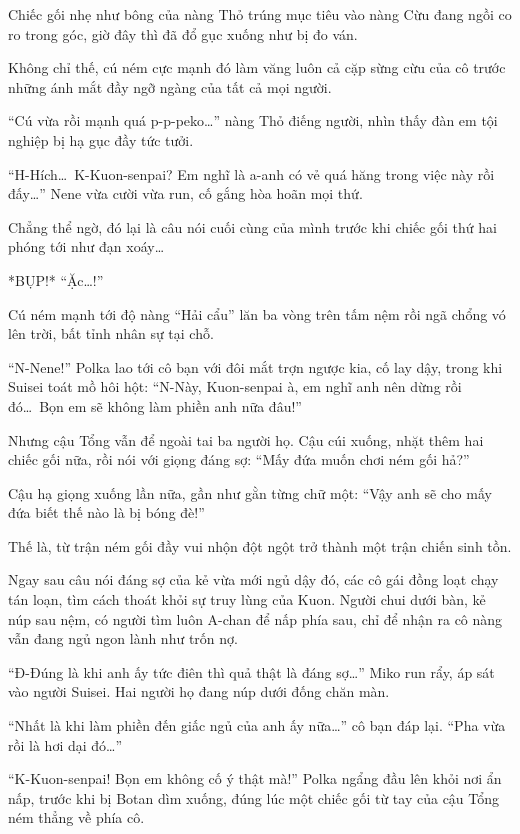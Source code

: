 \documentclass[../main.tex]{subfiles}
\begin{document}
Chiếc gối nhẹ như bông của nàng Thỏ trúng mục tiêu vào nàng Cừu đang ngồi co ro trong góc, giờ đây thì đã đổ gục xuống như bị đo ván.

Không chỉ thế, cú ném cực mạnh đó làm văng luôn cả cặp sừng cừu của cô trước những ánh mắt đầy ngỡ ngàng của tất cả mọi người.

``Cú vừa rồi mạnh quá p-p-peko\dots'' nàng Thỏ điếng người, nhìn thấy đàn em tội nghiệp bị hạ gục đầy tức tưởi.

``H-Hích\dots\ K-Kuon-senpai? Em nghĩ là a-anh có vẻ quá hăng trong việc này rồi đấy\dots'' Nene vừa cười vừa run, cố gắng hòa hoãn mọi thứ.

Chẳng thể ngờ, đó lại là câu nói cuối cùng của mình trước khi chiếc gối thứ hai phóng tới như đạn xoáy\dots

*BỤP!* ``Ặc\dots!''

Cú ném mạnh tới độ nàng ``Hải cẩu'' lăn ba vòng trên tấm nệm rồi ngã chổng vó lên trời, bất tỉnh nhân sự tại chỗ.

``N-Nene!'' Polka lao tới cô bạn với đôi mắt trợn ngược kia, cố lay dậy, trong khi Suisei toát mồ hôi hột: ``N-Này, Kuon-senpai à, em nghĩ anh nên dừng rồi đó\dots\ Bọn em sẽ không làm phiền anh nữa đâu!''

Nhưng cậu Tổng vẫn để ngoài tai ba người họ. Cậu cúi xuống, nhặt thêm hai chiếc gối nữa, rồi nói với giọng đáng sợ: ``Mấy đứa muốn chơi ném gối hả?''

Cậu hạ giọng xuống lần nữa, gần như gằn từng chữ một: ``Vậy anh sẽ cho mấy đứa biết thế nào là bị bóng đè!''

Thế là, từ trận ném gối đầy vui nhộn đột ngột trở thành một trận chiến sinh tồn.

Ngay sau câu nói đáng sợ của kẻ vừa mới ngủ dậy đó, các cô gái đồng loạt chạy tán loạn, tìm cách thoát khỏi sự truy lùng của Kuon. Người chui dưới bàn, kẻ núp sau nệm, có người tìm luôn A-chan để nấp phía sau, chỉ để nhận ra cô nàng vẫn đang ngủ ngon lành như trốn nợ.

``Đ-Đúng là khi anh ấy tức điên thì quả thật là đáng sợ\dots'' Miko run rẩy, áp sát vào người Suisei. Hai người họ đang núp dưới đống chăn màn.

``Nhất là khi làm phiền đến giấc ngủ của anh ấy nữa\dots'' cô bạn đáp lại. ``Pha vừa rồi là hơi dại đó\dots''

``K-Kuon-senpai! Bọn em không cố ý thật mà!'' Polka ngẩng đầu lên khỏi nơi ẩn nấp, trước khi bị Botan dìm xuống, đúng lúc một chiếc gối từ tay của cậu Tổng ném thẳng về phía cô.
\end{document}
